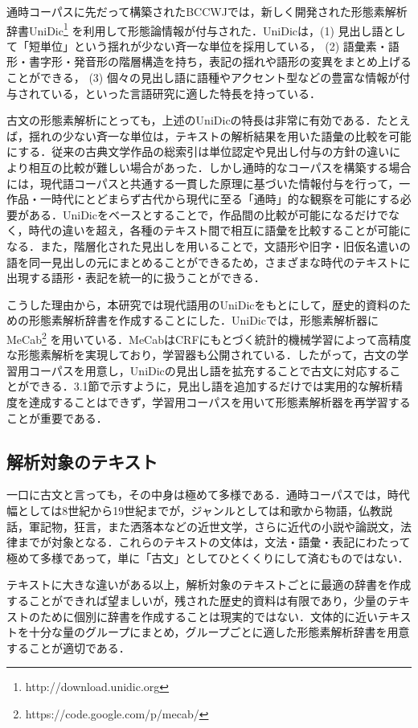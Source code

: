 \documentclass[japanese]{jnlp_1.4}
\begin{document}
通時コーパスに先だって構築されたBCCWJでは，新しく開発された形態素解析辞書UniDic\footnote{http://download.unidic.org} を利用して形態論情報が付与された．UniDicは，(1) 見出し語として「短単位」という揺れが少ない斉一な単位を採用している， (2) 語彙素・語形・書字形・発音形の階層構造を持ち，表記の揺れや語形の変異をまとめ上げることができる， (3) 個々の見出し語に語種やアクセント型などの豊富な情報が付与されている，といった言語研究に適した特長を持っている\cite{伝2007}．

古文の形態素解析にとっても，上述のUniDicの特長は非常に有効である．たとえば，揺れの少ない斉一な単位は，テキストの解析結果を用いた語彙の比較を可能にする．従来の古典文学作品の総索引は単位認定や見出し付与の方針の違いにより相互の比較が難しい場合があった．しかし通時的なコーパスを構築する場合には，現代語コーパスと共通する一貫した原理に基づいた情報付与を行って，一作品・一時代にとどまらず古代から現代に至る「通時」的な観察を可能にする必要がある．UniDicをベースとすることで，作品間の比較が可能になるだけでなく，時代の違いを超え，各種のテキスト間で相互に語彙を比較することが可能になる．また，階層化された見出しを用いることで，文語形や旧字・旧仮名遣いの語を同一見出しの元にまとめることができるため，さまざまな時代のテキストに出現する語形・表記を統一的に扱うことができる． 

こうした理由から，本研究では現代語用のUniDicをもとにして，歴史的資料のための形態素解析辞書を作成することにした．UniDicでは，形態素解析器にMeCab\footnote{https://code.google.com/p/mecab/} \cite{Kudo2004}を用いている．MeCabはCRF\cite{Lafferty2001}にもとづく統計的機械学習によって高精度な形態素解析を実現しており，学習器も公開されている．したがって，古文の学習用コーパスを用意し，UniDicの見出し語を拡充することで古文に対応することができる．3.1節で示すように，見出し語を追加するだけでは実用的な解析精度を達成することはできず，学習用コーパスを用いて形態素解析器を再学習することが重要である．


\subsection{解析対象のテキスト}

一口に古文と言っても，その中身は極めて多様である．通時コーパスでは，時代幅としては8世紀から19世紀までが，ジャンルとしては和歌から物語，仏教説話，軍記物，狂言，また洒落本などの近世文学，さらに近代の小説や論説文，法律までが対象となる．これらのテキストの文体は，文法・語彙・表記にわたって極めて多様であって，単に「古文」としてひとくくりにして済むものではない\cite{小木曽2011}．

テキストに大きな違いがある以上，解析対象のテキストごとに最適の辞書を作成することができれば望ましいが，残された歴史的資料は有限であり，少量のテキストのために個別に辞書を作成することは現実的ではない．文体的に近いテキストを十分な量のグループにまとめ，グループごとに適した形態素解析辞書を用意することが適切である．
\end{document}
